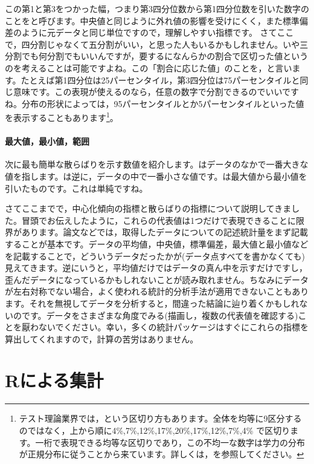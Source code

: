 \documentclass{ltjsbook}
\begin{document}
この第1と第3をつかった幅，つまり第3四分位数から第1四分位数を引いた数字のことをと呼びます。中央値と同じように外れ値の影響を受けにくく，また標準偏差のように元データと同じ単位ですので，理解しやすい指標です。
さてここで，四分割じゃなくて五分割がいい，と思った人もいるかもしれません。いや三分割でも何分割でもいいんですが，要するになんらかの割合で区切った値というのを考えることは可能ですよね。この「割合に応じた値」のことを，と言います。たとえば第1四分位は25パーセンタイル，第3四分位は75パーセンタイルと同じ意味です。この表現が使えるのなら，任意の数字で分割できるのでいいですね。分布の形状によっては，95パーセンタイルとか5パーセンタイルといった値を表示することもあります\footnote{テスト理論業界では，という区切り方もあります。全体を均等に9区分するのではなく，上から順に4\%,7\%,12\%,17\%,20\%,17\%,12\%,7\%,4\% で区切ります。一桁で表現できる均等な区切りであり，この不均一な数字は学力の分布が正規分布に従うことから来ています。詳しくは，\textcite{TDE2022}を参照してください。}。

\paragraph{最大値，最小値，範囲}
次に最も簡単な散らばりを示す数値を紹介します。はデータのなかで一番大きな値を指します。は逆に，データの中で一番小さな値です。は最大値から最小値を引いたものです。これは単純ですね。


さてここまでで，中心化傾向の指標と散らばりの指標について説明してきました。冒頭でお伝えしたように，これらの代表値は1つだけで表現できることに限界があります。論文などでは，取得したデータについての記述統計量をまず記載することが基本です。データの平均値，中央値，標準偏差，最大値と最小値などを記載することで，どういうデータだったかが(データ点すべてを書かなくても)見えてきます。逆にいうと，平均値だけではデータの真ん中を示すだけですし，歪んだデータになっているかもしれないことが読み取れません。ちなみにデータが左右対称でない場合，よく使われる統計的分析手法が適用できないこともあります。それを無視してデータを分析すると，間違った結論に辿り着くかもしれないのです。データをさまざまな角度でみる(描画し，複数の代表値を確認する)ことを厭わないでください。幸い，多くの統計パッケージはすぐにこれらの指標を算出してくれますので，計算の苦労はありません。

\section{Rによる集計}
\end{document}
